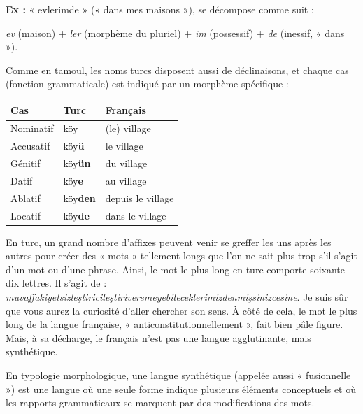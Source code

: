 \noindent\textbf{Ex :} « evlerimde » (« dans mes maisons »), se décompose comme suit :

\noindent\textit{ev} (maison) + \textit{ler} (morphème du pluriel) + \textit{im} (possessif) + \textit{de} (inessif, « dans »).

Comme en tamoul, les noms turcs disposent aussi de déclinaisons, et chaque cas (fonction grammaticale) est indiqué par un morphème spécifique :

\begin{center}
\begin{tabularx}{.87\linewidth}{>{\raggedright\arraybackslash}X >{\raggedright\arraybackslash}X >{\raggedright\arraybackslash}X}
\toprule
\textbf{Cas} & \textbf{Turc} & \textbf{Français}\\\midrule
Nominatif & köy & (le) village\\
Accusatif & köy\textbf{ü} & le village\\
Génitif & köy\textbf{ün} & du village\\
Datif & köy\textbf{e} & au village\\
Ablatif & köy\textbf{den} & depuis le village\\
Locatif & köy\textbf{de} & dans le village\\\bottomrule
\end{tabularx}
\end{center}

En turc, un grand nombre d’affixes peuvent venir se greffer les uns après les autres pour créer des « mots » tellement longs que l’on ne sait plus trop s’il s’agit d’un mot ou d’une phrase. Ainsi, le mot le plus long en turc comporte soixante-dix lettres. Il s’agit de : \textit{muvaffakiyetsizleştirici\discretionary{}{}{}leştiriveremeyebileceklerimizdenmiş\discretionary{}{}{}sinizcesine}. Je suis sûr que vous aurez la curiosité d’aller chercher son sens. À côté de cela, le mot le plus long de la langue française, « anticonstitutionnellement », fait bien pâle figure. Mais, à sa décharge, le français n’est pas une langue agglutinante, mais synthétique.

En typologie morphologique, une langue synthétique (appelée aussi « fusionnelle ») est une langue où une seule forme indique plusieurs éléments conceptuels et où les rapports grammaticaux se marquent par des modifications des mots.

